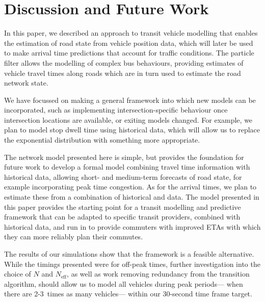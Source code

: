 \section{Discussion and Future Work}
\label{sec:discussion}

In this paper, we described an approach to transit vehicle modelling
that enables the \rt estimation of road state from vehicle position data,
which will later be used to make arrival time predictions
that account for \rt traffic conditions.
The particle filter allows the modelling of complex bus behaviours,
providing estimates of vehicle travel times along roads
which are in turn used to estimate the road network state.


We have focussed on making a general framework
into which new models can be incorporated,
such as implementing intersection-specific behaviour
once intersection locations are available,
or exiting models changed.
For example, we plan to model stop dwell time using historical data,
which will allow us to replace the exponential distribution
with something more appropriate.


The network model presented here is simple, 
but provides the foundation for future work to
develop a formal model combining \rt travel time information with historical data, 
allowing short- and medium-term forecasts of road state,
for example incorporating peak time congestion.
As for the arrival times, 
we plan to estimate these from a combination of historical 
and \rt data.
The model presented in this paper provides the starting point
for a transit modelling and predictive framework
that can be adapted to specific transit providers,
combined with historical data,
and run in \rt to provide commuters with
improved ETAs with which they can more reliably
plan their commutes.


The results of our simulations show that the framework is a 
feasible \rt alternative.
While the timings presented were for off-peak times,
further investigation into the choice of $N$ and $N_\text{eff}$,
as well as work removing redundancy from the transition algorithm,
should allow us to model all vehicles during peak periods---%
when there are 2-3~times as many vehicles---%
within our 30-second time frame target.
